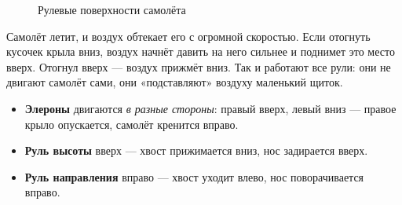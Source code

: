 \begin{figure}[H]
\centering
{}
\caption{Рулевые поверхности самолёта}
\end{figure}

\begin{whyit}
Самолёт летит, и воздух обтекает его с огромной скоростью. Если отогнуть кусочек крыла
вниз, воздух начнёт давить на него сильнее и поднимет это место вверх. Отогнул вверх ---
воздух прижмёт вниз. Так и работают все рули: они не двигают самолёт сами, они
«подставляют» воздуху маленький щиток.
\begin{itemize}
  \item \textbf{Элероны} двигаются \emph{в разные стороны}: правый вверх, левый вниз ---
        правое крыло опускается, самолёт кренится вправо.
  \item \textbf{Руль высоты} вверх --- хвост прижимается вниз, нос задирается вверх.
  \item \textbf{Руль направления} вправо --- хвост уходит влево, нос поворачивается вправо.
\end{itemize}
\end{whyit}

